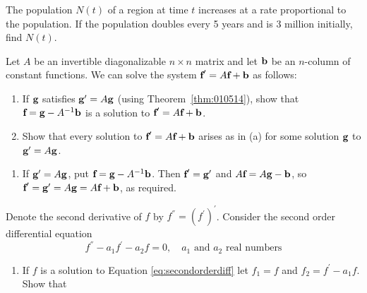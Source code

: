 \begin{multicols}{2}
\begin{ex}
The population $N(t)$ of a region at time $t$ increases at a rate proportional to the population. If the population doubles every 5 years and is 3 million initially, find $N(t)$.
\end{ex}

\begin{ex}
Let $A$ be an invertible diagonalizable $n \times n$ matrix and let $\textbf{b}$ be an $n$-column of constant functions. We can solve the system $\textbf{f}^{\prime} = A\textbf{f} + \textbf{b}$ as follows:


\begin{enumerate}[label={\alph*.}]
\item If $\textbf{g}$ satisfies $\textbf{g}^{\prime} = A\textbf{g}$ (using Theorem~\ref{thm:010514}), show that $\textbf{f} = \textbf{g} - A^{-1}\textbf{b}$ is a solution to $\textbf{f}^{\prime} = A\textbf{f} + \textbf{b}$.

\item Show that every solution to $\textbf{f}^{\prime} = A\textbf{f} + \textbf{b}$ arises as in (a) for some solution $\textbf{g}$ to $\textbf{g}^{\prime} = A\textbf{g}$.

\end{enumerate}
\begin{sol}
\begin{enumerate}[label={\alph*.}]
\item  If $\textbf{g}^{\prime} = A\textbf{g}$, put $\textbf{f} = \textbf{g} - A^{-1}\textbf{b}$. Then $\textbf{f}^{\prime} = \textbf{g}^{\prime}$ and $A\textbf{f} = A\textbf{g} - \textbf{b}$, so $\textbf{f}^{\prime} = \textbf{g}^{\prime} = A\textbf{g} = A\textbf{f} + \textbf{b}$, as required.

\end{enumerate}
\end{sol}
\end{ex}

\begin{ex} \label{ex:3_5_6}
Denote the second derivative of $f$ by $f^{\dprime} = (f^{\prime})^{\prime}$. Consider the second order differential equation 
\begin{equation}\label{eq:secondorderdiff}
f^{\dprime} - a_1 f^{\prime}-a_2 f = 0, \quad a_1 \mbox{ and } a_2 \mbox{ real numbers} 
\end{equation}
\begin{enumerate}[label={\alph*.}]
\item If $f$ is a solution to Equation \ref{eq:secondorderdiff}
 let $f_{1} = f$ and $f_{2} = f^{\prime} - a_{1}f$. Show that


\end{enumerate}
\end{ex}
\end{multicols}
